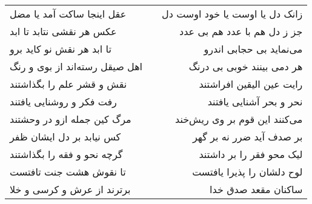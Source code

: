 \begin{center}
\begin{longtable}{l p{0.5cm} r}
عقل اینجا ساکت آمد یا مضل
&&
زانک دل یا اوست یا خود اوست دل
\\
عکس هر نقشی نتابد تا ابد
&&
جز ز دل هم با عدد هم بی عدد
\\
تا ابد هر نقش نو کاید برو
&&
می‌نماید بی حجابی اندرو
\\
اهل صیقل رسته‌اند از بوی و رنگ
&&
هر دمی بینند خوبی بی درنگ
\\
نقش و قشر علم را بگذاشتند
&&
رایت عین الیقین افراشتند
\\
رفت فکر و روشنایی یافتند
&&
نحر و بحر آشنایی یافتند
\\
مرگ کین جمله ازو در وحشتند
&&
می‌کنند این قوم بر وی ریش‌خند
\\
کس نیابد بر دل ایشان ظفر
&&
بر صدف آید ضرر نه بر گهر
\\
گرچه نحو و فقه را بگذاشتند
&&
لیک محو فقر را بر داشتند
\\
تا نقوش هشت جنت تافتست
&&
لوح دلشان را پذیرا یافتست
\\
برترند از عرش و کرسی و خلا
&&
ساکنان مقعد صدق خدا
\\
\end{longtable}
\end{center}
